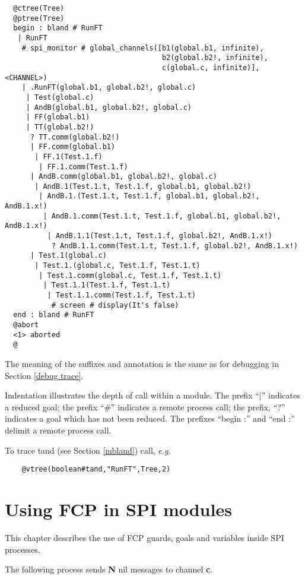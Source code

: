 \begin{verbatim}
  @ctree(Tree)
  @ptree(Tree)
  begin : bland # RunFT
   | RunFT
    # spi_monitor # global_channels([b1(global.b1, infinite),
                                     b2(global.b2!, infinite),
                                     c(global.c, infinite)], <CHANNEL>)
    | .RunFT(global.b1, global.b2!, global.c)
     | Test(global.c)
     | AndB(global.b1, global.b2!, global.c)
     | FF(global.b1)
     | TT(global.b2!)
      ? TT.comm(global.b2!)
      | FF.comm(global.b1)
       | FF.1(Test.1.f)
        | FF.1.comm(Test.1.f)
      | AndB.comm(global.b1, global.b2!, global.c)
       | AndB.1(Test.1.t, Test.1.f, global.b1, global.b2!)
        | AndB.1.(Test.1.t, Test.1.f, global.b1, global.b2!, AndB.1.x!)
         | AndB.1.comm(Test.1.t, Test.1.f, global.b1, global.b2!, AndB.1.x!)
          | AndB.1.1(Test.1.t, Test.1.f, global.b2!, AndB.1.x!)
           ? AndB.1.1.comm(Test.1.t, Test.1.f, global.b2!, AndB.1.x!)
      | Test.1(global.c)
       | Test.1.(global.c, Test.1.f, Test.1.t)
        | Test.1.comm(global.c, Test.1.f, Test.1.t)
         | Test.1.1(Test.1.f, Test.1.t)
          | Test.1.1.comm(Test.1.f, Test.1.t)
           # screen # display(It's false)
  end : bland # RunFT
  @abort
  <1> aborted
  @
\end{verbatim}

\noindent
The meaning of the suffixes and annotation is the same as for
debugging in Section \ref{debug trace}.

\noindent
Indentation illustrates the depth of call within a module.
The prefix ``$|$'' indicates a reduced goal; the prefix
``\#'' indicates a remote process call; the prefix,
``?''  indicates a goal which has not been reduced.  The
prefixes ``begin :'' and ``end :'' delimit a remote process
call.

\noindent
To trace tand (see Section \ref{mbland}) call, {\em e.g.}

\begin{verbatim}
    @vtree(boolean#tand,"RunFT",Tree,2)
\end{verbatim}

\chapter{Using FCP in SPI modules}
\label{usingFCP}

This chapter describes the use of FCP guards, goals and
variables inside SPI processes.

The following process sends {\bf N} nil messages to channel {\bf c}.

